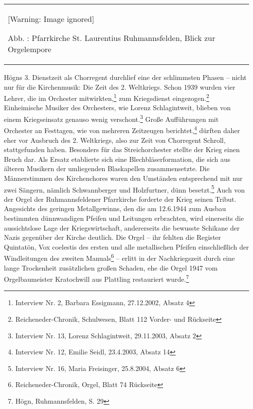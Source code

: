 \documentclass[a4paper]{article}
\newcounter{Abb}
\renewcommand\theAbb{\arabic{Abb}}
\begin{document}
\begin{center}
\begin{minipage}{5.593cm}
\begin{flushleft}
\tablefirsthead{}
\tablehead{}
\tabletail{}
\tablelasttail{}
\begin{supertabular}{m{5.393cm}}
  [Warning: Image ignored] %
 
Abb. \stepcounter{Abb}{\theAbb}: Pfarrkirche St. Laurentius
Ruhmannsfelden, Blick zur Orgelempore\\
\end{supertabular}
\end{flushleft}
\end{minipage}
\end{center}
Högns 3. Dienstzeit als Chorregent durchlief eine der schlimmsten Phasen
– nicht nur für die Kirchenmusik: Die Zeit des 2. Weltkriegs. Schon
1939 wurden vier Lehrer, die im Orchester mitwirkten,\footnote{
Interview Nr. 2, Barbara Essigmann, 27.12.2002, Absatz 4} zum
Kriegsdienst eingezogen.\footnote{ Reicheneder-Chronik, Schulwesen,
Blatt 112 Vorder- und Rückseite} Einheimische Musiker des Orchesters,
wie Lorenz Schlagintweit, blieben von einem Kriegseinsatz genauso wenig
verschont.\footnote{ Interview Nr. 13, Lorenz Schlagintweit,
29.11.2003, Absatz 2} Große Aufführungen mit Orchester an Festtagen,
wie von mehreren Zeitzeugen berichtet,\footnote{ Interview Nr. 12,
Emilie Seidl, 23.4.2003, Absatz 14} dürften daher eher vor Ausbruch des
2. Weltkriegs, also zur Zeit von Chorregent Schroll, stattgefunden
haben. Besonders für das Streichorchester stellte der Krieg einen Bruch
dar. Als Ersatz etablierte sich eine Blechbläserformation, die sich aus
älteren Musikern der umliegenden Blaskapellen zusammensetzte. Die
Männerstimmen des Kirchenchores waren den Umständen entsprechend mit
nur zwei Sängern, nämlich Schwannberger und Holzfurtner, dünn
besetzt.\footnote{ Interview Nr. 16, Maria Freisinger, 25.8.2004,
Absatz 6} Auch von der Orgel der Ruhmannsfeldener Pfarrkirche forderte
der Krieg seinen Tribut. Angesichts des geringen Metallgewinns, den die
am 12.6.1944 zum Ausbau bestimmten dünnwandigen Pfeifen und Leitungen
erbrachten, wird einerseits die aussichtslose Lage der
Kriegswirtschaft, andererseits die bewusste Schikane der Nazis
gegenüber der Kirche deutlich. Die Orgel – ihr fehlten die Register
Quintatön, Vox coelestis des ersten und alle metallischen Pfeifen
einschließlich der Windleitungen des zweiten Manuals\footnote{
Reicheneder-Chronik, Orgel, Blatt 74 Rückseite} – erlitt in der
Nachkriegszeit durch eine lange Trockenheit zusätzlichen großen
Schaden, ehe die Orgel 1947 vom Orgelbaumeister Kratochwill aus
Plattling restauriert wurde.\footnote{ Högn, Ruhmannsfelden, S. 29}
\end{document}
